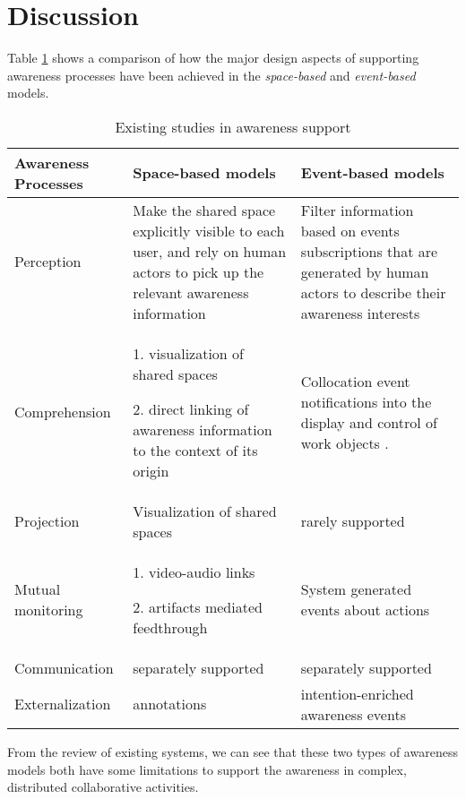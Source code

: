 \section{Discussion} %
\label{sec:discussion}
Table \ref{tab:existing_studies} shows a comparison of how the major design aspects of supporting awareness processes have been achieved in the \emph{space-based} and \emph{event-based} models.

\begin{table}[htbp]
\centering
\footnotesize
\begin{tabular}{>{\raggedright}p{1.1in}>{\raggedright}p{2.2in}>{\raggedright}p{2.2in}}

\toprule 
\textbf{Awareness Processes} & \textbf{Space-based models} & \textbf{Event-based models}\tabularnewline
\midrule 
Perception & Make the shared space explicitly visible to each user, and rely on
human actors to pick up the relevant awareness information  & Filter information based on events subscriptions that are generated by
human actors to describe their awareness interests\tabularnewline
\midrule 
Comprehension & 1. visualization of shared spaces

2. direct linking of awareness information to the context of its origin & Collocation event notifications into the display and control of work
objects \cite{prinz1999a,carroll2003a}.\tabularnewline
\midrule 
Projection & Visualization of shared spaces & rarely supported\tabularnewline
\midrule 
Mutual monitoring & 1. video-audio links \cite{Dourish1992}

2. artifacts mediated feedthrough \cite{Tee2009} & System generated events about actions \cite{Fuchs1995}\tabularnewline
\midrule 
Communication & separately supported & separately supported\tabularnewline
\midrule 
Externalization & annotations \cite{Zheng2006,Weng2004} & intention-enriched awareness events \cite{Rittenbruch2007}\tabularnewline
\bottomrule

\end{tabular}  
\caption{Existing studies in awareness support}
\label{tab:existing_studies}
\end{table}

From the review of existing systems, we can see that these two types of awareness models both have some limitations to support the awareness in complex, distributed collaborative activities. 

